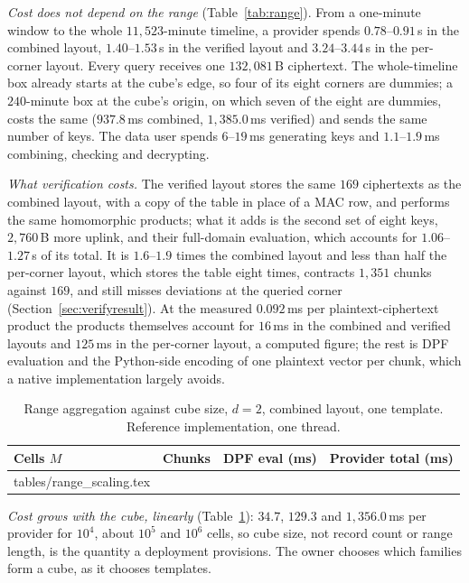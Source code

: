 \documentclass[a4paper,fleqn]{cas-sc}
\begin{document}
\emph{Cost does not depend on the range} (Table~\ref{tab:range}). From a
one-minute window to the whole $11{,}523$-minute timeline, a provider spends
$0.78$--$0.91$\,s in the combined layout, $1.40$--$1.53$\,s in the verified
layout and $3.24$--$3.44$\,s in the per-corner layout. Every query receives one
$132{,}081$\,B ciphertext. The whole-timeline box already starts at the cube's
edge, so four of its eight corners are dummies; a $240$-minute box at the
cube's origin, on which seven of the eight are dummies, costs the same
($937.8$\,ms combined, $1{,}385.0$\,ms verified) and sends the same number of
keys. The data user spends $6$--$19$\,ms generating keys and $1.1$--$1.9$\,ms
combining, checking and decrypting.

\emph{What verification costs.} The verified layout stores the same $169$
ciphertexts as the combined layout, with a copy of the table in place of a MAC
row, and performs the same homomorphic products; what it adds is the second
set of eight keys, $2{,}760$\,B more uplink, and their full-domain evaluation,
which accounts for $1.06$--$1.27$\,s of its total. It is $1.6$--$1.9$ times
the combined layout and less than half the per-corner layout, which stores the
table eight times, contracts $1{,}351$ chunks against $169$, and still misses
deviations at the queried corner (Section~\ref{sec:verifyresult}). At the
measured $0.092$\,ms per plaintext-ciphertext product the products themselves
account for $16$\,ms in the combined and verified layouts and $125$\,ms in the
per-corner layout, a computed figure; the rest is DPF evaluation and the
Python-side encoding of one plaintext vector per chunk, which a native
implementation largely avoids.

\begin{table}[pos=htbp]
\caption{Range aggregation against cube size, $d=2$, combined layout, one
template. Reference implementation, one thread.}
\label{tab:rangescale}
\centering
\footnotesize
\begin{tabular*}{\tblwidth}{@{\extracolsep{\fill}}lccc@{}}
\toprule
Cells $M$ & Chunks & DPF eval (ms) & Provider total (ms) \\
\midrule
{} tables/range_scaling.tex 
\bottomrule
\end{tabular*}
\end{table}

\emph{Cost grows with the cube, linearly} (Table~\ref{tab:rangescale}): $34.7$,
$129.3$ and $1{,}356.0$\,ms per provider for $10^4$, about $10^5$ and $10^6$
cells, so cube size, not record count or range length, is the quantity a
deployment provisions. The owner chooses which families form a cube, as it
chooses templates.
\end{document}
